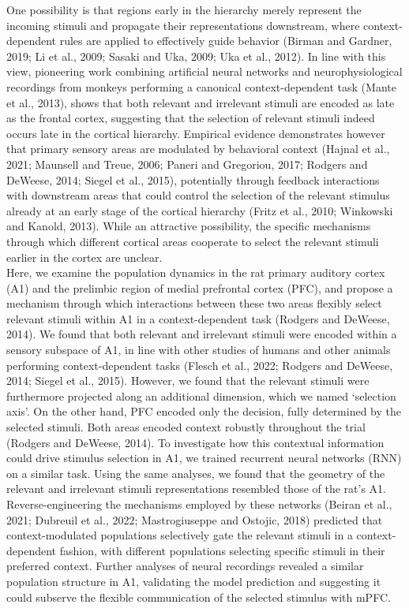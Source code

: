 \documentclass[12pt]{article}
\begin{document}
One possibility is that regions early in the hierarchy merely represent the incoming stimuli and propagate their representations downstream, where context-dependent rules are applied to effectively guide behavior (Birman and Gardner, 2019; Li et al., 2009; Sasaki and Uka, 2009; Uka et al., 2012). In line with this view, pioneering work combining artificial neural networks and neurophysiological recordings from monkeys performing a canonical context-dependent task (Mante et al., 2013), shows that both relevant and irrelevant stimuli are encoded as late as the frontal cortex, suggesting that the selection of relevant stimuli indeed occurs late in the cortical hierarchy. Empirical evidence demonstrates however that primary sensory areas are modulated by behavioral context (Hajnal et al., 2021; Maunsell and Treue, 2006; Paneri and Gregoriou, 2017; Rodgers and DeWeese, 2014; Siegel et al., 2015), potentially through feedback interactions with downstream areas that could control the selection of the relevant stimulus already at an early stage of the cortical hierarchy (Fritz et al., 2010; Winkowski and Kanold, 2013). While an attractive possibility, the specific mechanisms through which different cortical areas cooperate to select the relevant stimuli earlier in the cortex are unclear. \\

Here, we examine the population dynamics in the rat primary auditory cortex (A1) and the prelimbic region of medial prefrontal cortex (PFC), and propose a mechanism through which interactions between these two areas flexibly select relevant stimuli within A1 in a context-dependent task (Rodgers and DeWeese, 2014). We found that both relevant and irrelevant stimuli were encoded within a sensory subspace of A1, in line with other studies of humans and other animals performing context-dependent tasks (Flesch et al., 2022; Rodgers and DeWeese, 2014; Siegel et al., 2015). However, we found that the relevant stimuli were furthermore projected along an additional dimension, which we named ‘selection axis’. On the other hand, PFC encoded only the decision, fully determined by the selected stimuli. Both areas encoded context robustly throughout the trial (Rodgers and DeWeese, 2014). To investigate how this contextual information could drive stimulus selection in A1, we trained recurrent neural networks (RNN) on a similar task. Using the same analyses, we found that the geometry of the relevant and irrelevant stimuli representations resembled those of the rat’s A1. Reverse-engineering the mechanisms employed by these networks (Beiran et al., 2021; Dubreuil et al., 2022; Mastrogiuseppe and Ostojic, 2018) predicted that context-modulated populations selectively gate the relevant stimuli in a context-dependent fashion, with different populations selecting specific stimuli in their preferred context. Further analyses of neural recordings revealed a similar population structure in A1, validating the model prediction and suggesting it could subserve the flexible communication of the selected stimulus with mPFC. \\
\end{document}
